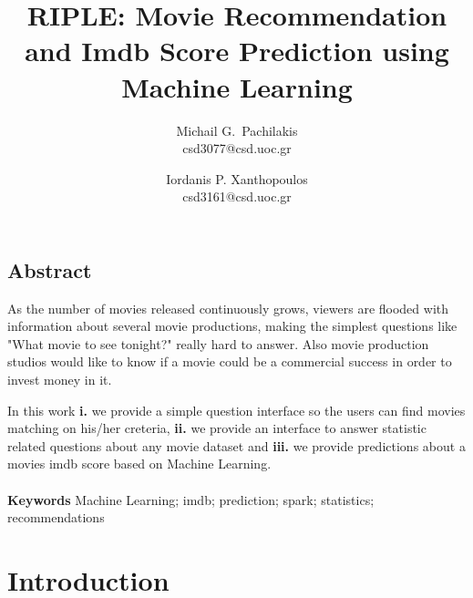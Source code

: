 \documentclass[letterpaper,twocolumn,10pt]{article}
\begin{document}
\date{}

\title{\Large \bf RIPLE: Movie Recommendation and Imdb Score Prediction using Machine Learning}

\author{
{\rm Michail G.\ Pachilakis}\\
csd3077@csd.uoc.gr
\and
{\rm Iordanis P. Xanthopoulos}\\
csd3161@csd.uoc.gr
} %

\maketitle

\thispagestyle{empty}


\subsection*{Abstract}
\par As the number of movies released continuously grows, viewers are flooded with information about several movie productions, making the simplest questions like "What movie to see tonight?" really hard to answer. Also movie production studios would like to know if a movie could be a commercial success in order to invest money in it.\par In this work \textbf{i.} we provide a simple question interface so the users can find movies matching on his/her creteria, \textbf{ii.} we provide an interface to answer statistic related questions about any movie dataset and \textbf{iii.} we provide predictions about a movies imdb score based on Machine Learning.\\
\\
\textbf{Keywords} Machine Learning; imdb; prediction; spark; statistics; recommendations


\section{Introduction}
\end{document}
